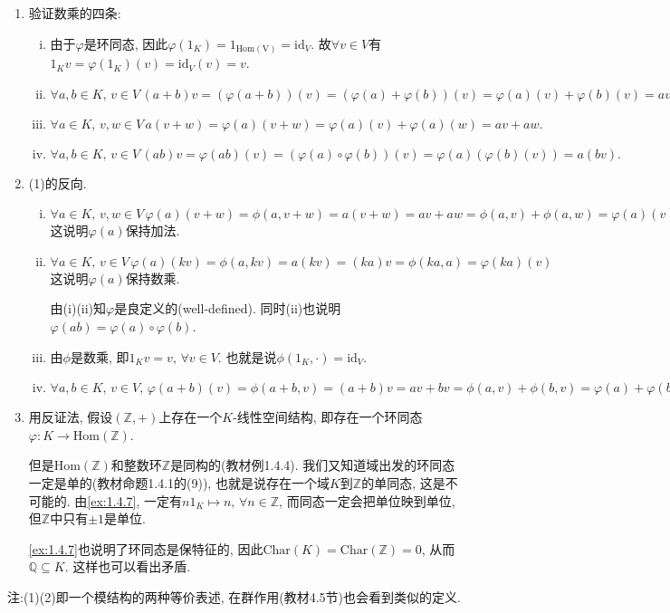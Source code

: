 \begin{solution}
\begin{enumerate}[(1)]
    \item 验证数乘的四条:
    \begin{enumerate}[(i)]
        \item 由于$\varphi$是环同态, 因此$\varphi(1_K) = 1_{\mathrm{Hom(V)}} = \mathrm{id}_V$. 故$\forall v \in V$有$1_Kv = \varphi(1_K)(v) = \mathrm{id}_V(v) = v$.
        \item \(
            \forall a, b \in K,\, v \in V\, (a + b)v = (\varphi(a + b))(v) = (\varphi(a) + \varphi(b))(v) = \varphi(a)(v) + \varphi(b)(v) = av + bv.
        \)
        \item \(
            \forall a \in K,\, v, w \in V\, a(v + w) = \varphi(a)(v + w) = \varphi(a)(v) + \varphi(a)(w) = av + aw.
        \)
        \item \(
            \forall a, b \in K,\, v \in V\, (ab)v = \varphi(ab)(v) = (\varphi(a) \circ \varphi(b))(v) = \varphi(a)(\varphi(b)(v)) = a(bv).
        \)
    \end{enumerate}
    \item (1)的反向.
    \begin{enumerate}[(i)]
        \item \(
            \forall a \in K,\, v, w \in V\, \varphi(a)(v + w) = \phi(a, v + w) = a(v + w) = av + aw = \phi(a, v) + \phi(a, w) = \varphi(a)(v) + \varphi(a)(w)
        \)这说明$\varphi(a)$保持加法.
        \item \(
            \forall a \in K,\, v \in V\, \varphi(a)(kv) = \phi(a, kv) = a(kv) = (ka)v = \phi(ka, a) = \varphi(ka)(v)
        \)这说明$\varphi(a)$保持数乘.

        由(i)(ii)知$\varphi$是良定义的(well-defined). 同时(ii)也说明$\varphi(ab) = \varphi(a) \circ \varphi(b)$.
        \item 由$\phi$是数乘, 即$1_Kv = v,\, \forall v \in V$. 也就是说$\phi(1_K, \cdot) = \mathrm{id}_V$.
        \item \(
            \forall a, b \in K,\, v \in V,\, \varphi(a + b)(v) = \phi(a + b, v) = (a + b)v = av + bv = \phi(a, v) + \phi(b, v) = \varphi(a) + \varphi(b)
        \)
    \end{enumerate}
    \item 用反证法, 假设$(\mathbb{Z}, +)$上存在一个$K$-线性空间结构, 即存在一个环同态$\varphi: K \to \mathrm{Hom}(\mathbb{Z})$.
    
    但是$\mathrm{Hom}(\mathbb{Z})$和整数环$\mathbb{Z}$是同构的(教材例1.4.4). 我们又知道域出发的环同态一定是单的(教材命题1.4.1的(9)), 也就是说存在一个域$K$到$\mathbb{Z}$的单同态, 这是不可能的.
    由\ref{ex:1.4.7}, 一定有$n1_K \mapsto n,\, \forall n \in \mathbb{Z}$, 而同态一定会把单位映到单位, 但$\mathbb{Z}$中只有$\pm1$是单位.
    
    \ref{ex:1.4.7}也说明了环同态是保特征的, 因此$\mathrm{Char}(K) = \mathrm{Char}(\mathbb{Z}) = 0$, 从而$\mathbb{Q} \subseteq K$. 这样也可以看出矛盾.
\end{enumerate}
注:(1)(2)即一个模结构的两种等价表述, 在群作用(教材4.5节)也会看到类似的定义.
\end{solution}

